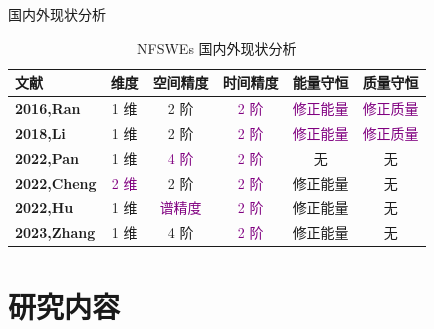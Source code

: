 \documentclass[aspectratio=169]{beamer}
\numberwithin{theorem}{section} %
\begin{document}
		\begin{frame}{国内外现状分析}
			\begin{table}[htbp]
				\centering
				\small
				\caption{NFSWEs 国内外现状分析}
					\begin{tabular}{lccccc}
					\toprule
					\textcolor[rgb]{0.227,0.373,0.306}{\textbf{文献}} & \textcolor[rgb]{0.227,0.373,0.306}{\textbf{维度}} & \textcolor[rgb]{0.227,0.373,0.306}{\textbf{空间精度}} & \textcolor[rgb]{0.227,0.373,0.306}{\textbf{时间精度}} & \textcolor[rgb]{0.227,0.373,0.306}{\textbf{能量守恒}} & \textcolor[rgb]{0.227,0.373,0.306}{\textbf{质量守恒}} \\
					\midrule
					\textcolor[rgb]{0.227,0.373,0.306}{\textbf{\cite{ranLinearlyImplicitConservative2016}{2016,Ran}}} & 1 维   & 2 阶   & \textcolor{purple}{2 阶}   & \textcolor{purple}{修正能量}  & \textcolor{purple}{修正质量} \\
					\midrule
					\textcolor[rgb]{0.227,0.373,0.306}{\textbf{\cite{liFastEnergyConserving2018}{2018,Li}}} & 1 维   & 2 阶   & \textcolor{purple}{2 阶}   & \textcolor{purple}{修正能量}  & \textcolor{purple}{修正质量} \\
					\midrule
					\textcolor[rgb]{0.227,0.373,0.306}{\textbf{\cite{panFourthorderDifferenceScheme2022}{2022,Pan}}} & 1 维   & \textcolor{purple}{4 阶}   & \textcolor{purple}{2 阶}   & 无     & 无 \\
					\midrule
					\textcolor[rgb]{0.227,0.373,0.306}{\textbf{\cite{chengConvergenceEnergyconservingScheme2022}{2022,Cheng}}} & \textcolor{purple}{2 维}   & 2 阶   & \textcolor{purple}{2 阶}   & 修正能量  & 无 \\
					\midrule
					\textcolor[rgb]{0.227,0.373,0.306}{\textbf{\cite{huEfficientEnergyPreserving2022}{2022,Hu}}} & 1 维   & \textcolor{purple}{谱精度}   & \textcolor{purple}{2 阶}   & 修正能量  & 无 \\
					\midrule
					\textcolor[rgb]{0.227,0.373,0.306}{\textbf{\cite{zhangHighorderStructurepreservingDifference2023}{2023,Zhang}}} & 1 维   & 4 阶   & \textcolor{purple}{2 阶}   & 修正能量  & 无 \\
					\bottomrule
					\end{tabular}%
				\label{tab:2}%
				\end{table}%
				\end{frame}
	
\section{研究内容}
\end{document}
